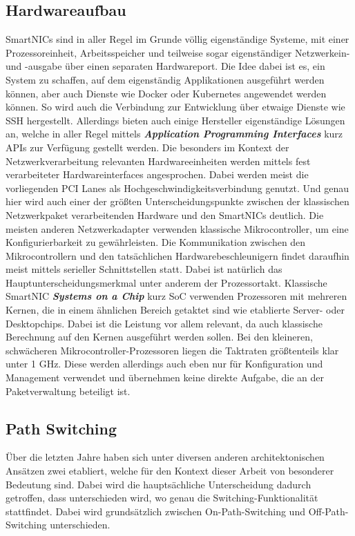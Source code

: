 \subsection{Hardwareaufbau}
SmartNICs sind in aller Regel im Grunde völlig eigenständige Systeme, mit einer Prozessoreinheit, Arbeitsspeicher und teilweise sogar eigenständiger Netzwerkein- und -ausgabe über einen separaten Hardwareport. Die Idee dabei ist es, ein System zu schaffen, auf dem eigenständig Applikationen ausgeführt werden können, aber auch Dienste wie Docker oder Kubernetes angewendet werden können. So wird auch die Verbindung zur Entwicklung über etwaige Dienste wie SSH hergestellt. Allerdings bieten auch einige Hersteller eigenständige Lösungen an, welche in aller Regel mittels \textbf{\textit{Application Programming Interfaces}} kurz APIs zur Verfügung gestellt werden. Die besonders im Kontext der Netzwerkverarbeitung relevanten Hardwareeinheiten werden mittels fest verarbeiteter Hardwareinterfaces angesprochen. Dabei werden meist die vorliegenden PCI Lanes als Hochgeschwindigkeitsverbindung genutzt. Und genau hier wird auch einer der größten Unterscheidungspunkte zwischen der klassischen Netzwerkpaket verarbeitenden Hardware und den SmartNICs deutlich. Die meisten anderen Netzwerkadapter verwenden klassische Mikrocontroller, um eine Konfigurierbarkeit zu gewährleisten. Die Kommunikation zwischen den Mikrocontrollern und den tatsächlichen Hardwarebeschleunigern findet daraufhin meist mittels serieller Schnittstellen statt. Dabei ist natürlich das Hauptunterscheidungsmerkmal unter anderem der Prozessortakt. Klassische SmartNIC \textbf{\textit{Systems on a Chip}} kurz SoC verwenden Prozessoren mit mehreren Kernen, die in einem ähnlichen Bereich getaktet sind wie etablierte Server- oder Desktopchips. Dabei ist die Leistung vor allem relevant, da auch klassische Berechnung auf den Kernen ausgeführt werden sollen. Bei den kleineren, schwächeren Mikrocontroller-Prozessoren liegen die Taktraten größtenteils klar unter 1 GHz. Diese werden allerdings auch eben nur für Konfiguration und Management verwendet und übernehmen keine direkte Aufgabe, die an der Paketverwaltung beteiligt ist.
\subsection{Path Switching}
Über die letzten Jahre haben sich unter diversen anderen architektonischen Ansätzen zwei etabliert, welche für den Kontext dieser Arbeit von besonderer Bedeutung sind. Dabei wird die hauptsächliche Unterscheidung dadurch getroffen, dass unterschieden wird, wo genau die Switching-Funktionalität stattfindet. Dabei wird grundsätzlich zwischen On-Path-Switching und Off-Path-Switching unterschieden.
